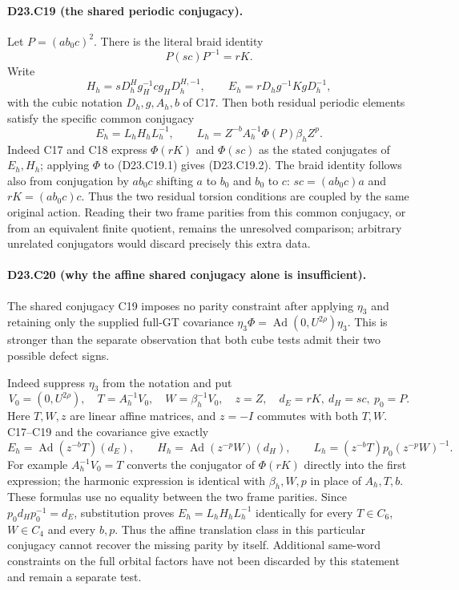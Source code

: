 \paragraph{D23.C19 (the shared periodic conjugacy).}
Let $P=(ab_0c)^2$. There is the literal braid identity
\[
                P(sc)P^{-1}=rK.
\tag{D23.C19.1}
\]
Write
\[
 H_h=sD^H_hg_H^{-1}c g_HD^{H,-1}_h,\qquad
 E_h=rD_hg^{-1}KgD_h^{-1},
\]
with the cubic notation $D_h,g,A_h,b$ of C17.
Then both residual periodic elements satisfy the specific
common conjugacy
\[
 E_h=L_hH_hL_h^{-1},\qquad
 L_h=Z^{-b}A_h^{-1}\Phi(P)\beta_hZ^p.
\tag{D23.C19.2}
\]
Indeed C17 and C18 express $\Phi(rK)$ and $\Phi(sc)$ as
the stated conjugates of $E_h,H_h$; applying $\Phi$ to
(D23.C19.1) gives (D23.C19.2). The braid identity follows
also from conjugation by $ab_0c$ shifting $a$ to $b_0$ and
$b_0$ to $c$: $sc=(ab_0c)a$ and $rK=(ab_0c)c$.
Thus the two residual torsion conditions are coupled by the
same original action. Reading their two frame parities from
this common conjugacy, or from an equivalent finite quotient,
remains the unresolved comparison; arbitrary unrelated
conjugators would discard precisely this extra data.

\paragraph{D23.C20 (why the affine shared conjugacy alone is insufficient).}
The shared conjugacy C19 imposes no parity constraint after applying
$\eta_3$ and retaining only the supplied full-GT covariance
$\eta_3\Phi=\operatorname{Ad}(0,U^{2\rho})\eta_3$.
This is stronger than the separate observation that both cube
tests admit their two possible defect signs.

Indeed suppress $\eta_3$ from the notation and put
\[
 V_0=(0,U^{2\rho}),\quad
 T=A_h^{-1}V_0,\quad W=\beta_h^{-1}V_0,\quad z=Z,
 \quad d_E=rK,\ d_H=sc,\ p_0=P.
\]
Here $T,W,z$ are linear affine matrices, and $z=-I$ commutes
with both $T,W$. C17--C19 and the covariance give exactly
\[
 E_h=\operatorname{Ad}(z^{-b}T)(d_E),\qquad
 H_h=\operatorname{Ad}(z^{-p}W)(d_H),\qquad
 L_h=(z^{-b}T)p_0(z^{-p}W)^{-1}.
\tag{D23.C20.1}
\]
For example $A_h^{-1}V_0=T$ converts the conjugator of
$\Phi(rK)$ directly into the first expression; the harmonic
expression is identical with $\beta_h,W,p$ in place of
$A_h,T,b$. These formulas use no equality between the two
frame parities. Since $p_0d_Hp_0^{-1}=d_E$, substitution proves
$E_h=L_hH_hL_h^{-1}$ identically for every
$T\in C_6$, $W\in C_4$ and every $b,p$.
Thus the affine translation class in this particular conjugacy
cannot recover the missing parity by itself. Additional
same-word constraints on the full orbital factors have not
been discarded by this statement and remain a separate test.
